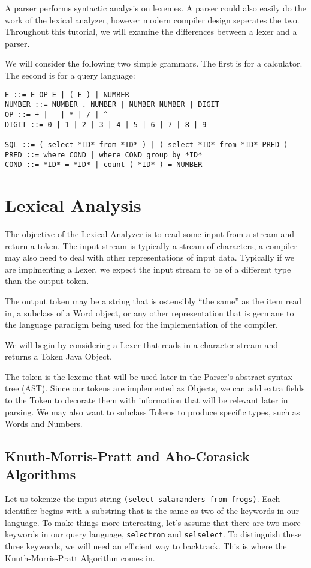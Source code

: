 \documentclass{article}[12pt]
\begin{document}
A parser performs syntactic analysis on lexemes. A parser could also easily do the work of the lexical analyzer, however modern compiler design seperates the two. Throughout this tutorial, we will examine the differences between a lexer and a parser.

We will consider the following two simple grammars. The first is for a calculator. The second is for a query language:

\begin{verbatim}
E ::= E OP E | ( E ) | NUMBER
NUMBER ::= NUMBER . NUMBER | NUMBER NUMBER | DIGIT
OP ::= + | - | * | / | ^
DIGIT ::= 0 | 1 | 2 | 3 | 4 | 5 | 6 | 7 | 8 | 9 

SQL ::= ( select *ID* from *ID* ) | ( select *ID* from *ID* PRED )
PRED ::= where COND | where COND group by *ID*
COND ::= *ID* = *ID* | count ( *ID* ) = NUMBER
\end{verbatim}

\section{Lexical Analysis}
The objective of the Lexical Analyzer is to read some input from a stream and return a token. The input stream is typically a stream of characters, a compiler may also need to deal with other representations of input data. Typically if we are implmenting a Lexer, we expect the input stream to be of a different type than the output token. 

The output token may be a string that is ostensibly ``the same'' as the item read in, a subclass of a Word object, or any other representation that is germane to the language paradigm being used for the implementation of the compiler. 

We will begin by considering a Lexer that reads in a character stream and returns a Token Java Object. 

The token is the lexeme that will be used later in the Parser's abstract syntax tree (AST). Since our tokens are implemented as Objects, we can add extra fields to the Token to decorate them with information that will be relevant later in parsing. We may also want to subclass Tokens to produce specific types, such as Words and Numbers. 

\subsection{Knuth-Morris-Pratt and Aho-Corasick Algorithms}

Let us tokenize the input string \verb|(select salamanders from frogs)|. Each identifier begins with a substring that is the same as two of the keywords in our language. To make things more interesting, let's assume that there are two more keywords in our query language, \verb|selectron| and \verb|selselect|. To distinguish these three keywords, we will need an efficient way to backtrack. This is where the Knuth-Morris-Pratt Algorithm comes in.
\end{document}
